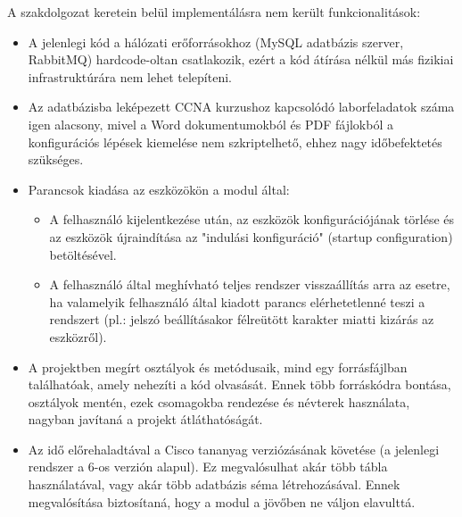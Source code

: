 \documentclass[12pt]{report}
\begin{document}
A szakdolgozat keretein belül implementálásra nem került funkcionalitások:
\begin{itemize}
    \item A jelenlegi kód a hálózati erőforrásokhoz (MySQL adatbázis szerver, RabbitMQ) hardcode-oltan csatlakozik, ezért a kód átírása nélkül más fizikiai infrastruktúrára nem lehet telepíteni.
    \item Az adatbázisba leképezett CCNA kurzushoz kapcsolódó laborfeladatok száma igen alacsony, mivel a Word dokumentumokból és PDF fájlokból a konfigurációs lépések kiemelése nem szkriptelhető, ehhez nagy időbefektetés szükséges.
    \item Parancsok kiadása az eszközökön a modul által:
    \begin{itemize}
        \item A felhasználó kijelentkezése után, az eszközök konfigurációjának törlése és az eszközök újraindítása az "indulási konfiguráció" (startup configuration) betöltésével.
        \item A felhasználó által meghívható teljes rendszer visszaállítás arra az esetre, ha valamelyik felhasználó által kiadott parancs elérhetetlenné teszi a rendszert (pl.: jelszó beállításakor félreütött karakter miatti kizárás az eszközről).
    \end{itemize}
    \item A projektben megírt osztályok és metódusaik, mind egy forrásfájlban találhatóak, amely nehezíti a kód olvasását. Ennek több forráskódra bontása, osztályok mentén, ezek csomagokba rendezése és névterek használata, nagyban javítaná a projekt átláthatóságát.
    \newpage
    \item Az idő előrehaladtával a Cisco tananyag verziózásának követése (a jelenlegi rendszer a 6-os verzión alapul). Ez megvalósulhat akár több tábla használatával, vagy akár több adatbázis séma létrehozásával. Ennek megvalósítása biztosítaná, hogy a modul a jövőben ne váljon elavulttá.
\end{itemize}
\end{document}
